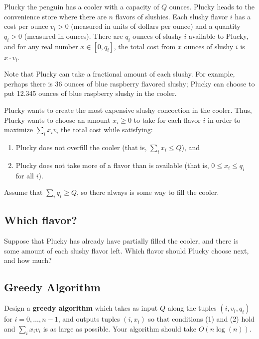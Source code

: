 \documentclass [12pt]{article}
\begin{document}
Plucky the penguin has a cooler with a capacity of $Q$ ounces. Plucky heads to the convenience store where there are $n$ flavors of slushies. Each slushy flavor $i$ has a cost per ounce $v_i > 0$ (measured in units of dollars per ounce) and a quantity $q_i > 0$ (measured in ounces). There are $q_i$ ounces of slushy $i$ available to Plucky, and for any real number $x \in [0, q_i]$, the total cost from $x$ ounces of slushy $i$ is $x \cdot v_i$.

Note that Plucky can take a fractional amount of each slushy. For example, perhaps there is 36 ounces of blue raspberry flavored slushy; Plucky can choose to put 12.345 ounces of blue raspberry slushy in the cooler.

Plucky wants to create the most expensive slushy concoction in the cooler. Thus, Plucky wants to choose an amount $x_i \geq 0$ to take for each flavor $i$ in order to maximize $\sum _{i} x_i v_i$ the total cost while satisfying: 

\begin{enumerate} 
  \item Plucky does not overfill the cooler (that is, $\sum _{i} x_i \leq Q$), and 
  \item Plucky does not take more of a flavor than is available (that is, $0 \leq x_i \leq q_i$ for all $i$). 
\end{enumerate} 

Assume that $\sum _{i} q_i \geq Q$, so there always is some way to fill the cooler. 

\subsection{Which flavor? } Suppose that Plucky has already have partially filled the cooler, and there is some amount of each slushy flavor left. Which flavor should Plucky choose next, and how much? 


\subsection{Greedy Algorithm } 

Design a \textbf{greedy algorithm} which takes as input $Q$ along the tuples $(i, v_i, q_i)$ for $i = 0, \dots , n-1$, and outputs tuples $(i, x_i)$ so that conditions (1) and (2) hold and $\sum _i x_i v_i$ is as large as possible. Your algorithm should take $O(n\log (n))$. 
\end{document}
